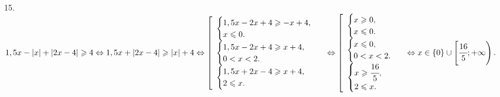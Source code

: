 15. $1,5x-|x|+|2x-4|\geqslant4\Leftrightarrow 1,5x+|2x-4|\geqslant |x|+4\Leftrightarrow \left[\begin{array}{l} \begin{cases} 1,5x-2x+4\geqslant -x+4,\\
x\leqslant0.\end{cases}\\ \begin{cases} 1,5x-2x+4\geqslant x+4,\\ 0<x<2.\end{cases} \\ \begin{cases} 1,5x+2x-4\geqslant x+4,\\ 2\leqslant x.\end{cases}\end{array}\right.
\Leftrightarrow \left[\begin{array}{l} \begin{cases} x\geqslant 0,\\
x\leqslant0.\end{cases}\\ \begin{cases} x\leqslant 0,\\ 0<x<2.\end{cases} \\ \begin{cases} x\geqslant \cfrac{16}{5},\\ 2\leqslant x.\end{cases}\end{array}\right.
\Leftrightarrow x\in \{0\}\cup\left[\cfrac{16}{5};+\infty\right).$\\
